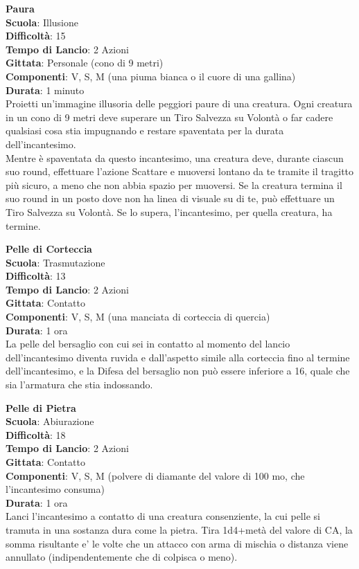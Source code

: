 \begin{multicols}{2}
\medskip\textbf{Paura}\\
\textbf{Scuola}: Illusione\\
\textbf{Difficoltà}: 15\\
\textbf{Tempo di Lancio}: 2 Azioni\\
\textbf{Gittata}: Personale (cono di 9 metri)\\
\textbf{Componenti}: V, S, M (una piuma bianca o il cuore di una gallina)\\
\textbf{Durata}: 1 minuto\\
Proietti un'immagine illusoria delle peggiori paure di una creatura. Ogni creatura in un cono di 9 metri deve superare un Tiro Salvezza su Volontà o far cadere qualsiasi cosa stia impugnando e restare spaventata per la durata dell'incantesimo.\\
Mentre è spaventata da questo incantesimo, una creatura deve, durante ciascun suo round, effettuare l'azione Scattare e muoversi lontano da te tramite il tragitto più sicuro, a meno che non abbia spazio per muoversi. Se la creatura termina il suo round in un posto dove non ha linea di visuale su di te, può effettuare un Tiro Salvezza su Volontà. Se lo supera, l'incantesimo, per quella creatura, ha termine. 

\medskip\textbf{Pelle di Corteccia}\\
\textbf{Scuola}: Trasmutazione\\
\textbf{Difficoltà}: 13\\
\textbf{Tempo di Lancio}: 2 Azioni\\
\textbf{Gittata}: Contatto\\
\textbf{Componenti}: V, S, M (una manciata di corteccia di quercia)\\
\textbf{Durata}: 1 ora\\
La pelle del bersaglio con cui sei in contatto al momento del lancio dell'incantesimo diventa ruvida e dall'aspetto simile alla corteccia fino al termine dell'incantesimo, e la Difesa del bersaglio non può essere inferiore a 16, quale che sia l'armatura che stia indossando.

\medskip\textbf{Pelle di Pietra}\\
\textbf{Scuola}: Abiurazione\\
\textbf{Difficoltà}: 18\\
\textbf{Tempo di Lancio}: 2 Azioni\\
\textbf{Gittata}: Contatto\\
\textbf{Componenti}: V, S, M (polvere di diamante del valore di 100 mo, che l'incantesimo consuma)\\
\textbf{Durata}: 1 ora\\
Lanci l'incantesimo a contatto di una creatura consenziente, la cui pelle si tramuta in una sostanza dura come la pietra. Tira 1d4+metà del valore di CA, la somma risultante e' le volte che un attacco con arma di mischia o distanza viene annullato (indipendentemente che di colpisca o meno).\\


\end{multicols}
